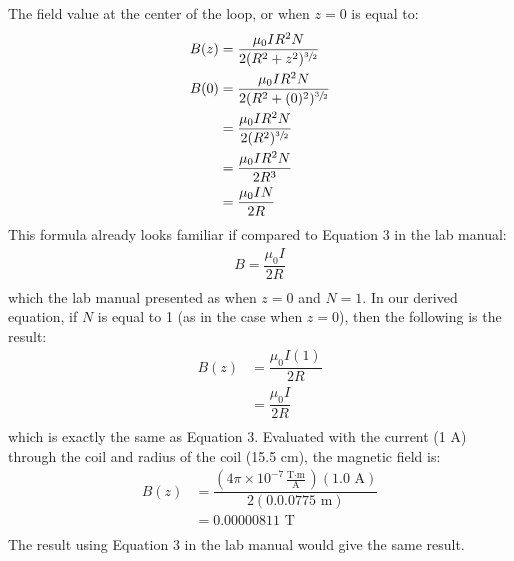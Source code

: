\documentclass [12pt, letterpaper, twoside] {article}
\begin{document}
\begin{enumerate}
\begin{enumerate}
        The field value at the center of the loop, or when \(z = 0\) is equal to:
        \begin{equation*}
          \begin{split}
            B(z) &= \dfrac{\mu_{0}IR^{2}N}{2(R^{2}+z^{2})^{\sfrac{3}{2}}} \\
            B(0) &= \dfrac{\mu_{0}IR^{2}N}{2(R^{2}+(0)^{2})^{\sfrac{3}{2}}} \\
                 &= \dfrac{\mu_{0}IR^{2}N}{2(R^{2})^{\sfrac{3}{2}}} \\
                 &= \dfrac{\mu_{0}IR^{2}N}{2R^{3}} \\
                 &= \dfrac{\mu_{0}IN}{2R} \\
          \end{split}
        \end{equation*}
        This formula already looks familiar if compared to Equation 3 in the lab manual:
        \begin{equation*}
          \begin{split}
            B = \dfrac{\mu_{0}I}{2R} \\
          \end{split}
        \end{equation*}
        which the lab manual presented as when \(z=0\) and \(N=1\). In our derived equation, if \(N\) is equal to 1 (as in the case when \(z=0\)), then the following is the result:
        \begin{equation*}
          \begin{split}
            B(z) &= \dfrac{\mu_{0}I(1)}{2R} \\
                 &=  \dfrac{\mu_{0}I}{2R} \\
          \end{split}
        \end{equation*}
        which is exactly the same as Equation 3. Evaluated with the current (1 A) through the coil and radius of the coil (15.5 cm), the magnetic field is:
        \begin{equation*}
          \begin{split}
            B(z) &= \dfrac{(4\pi\times{10}^{-7}\tfrac{\text{T}\cdot\text{m}}{\text{A}})(1.0\text{ A})}{2(0.0.0775\text{ m})} \\
                 &= 0.00000811\text{ T} \\ %
          \end{split}
        \end{equation*}
        The result using Equation 3 in the lab manual would give the same result.


\end{enumerate}
\end{enumerate}
\end{document}
